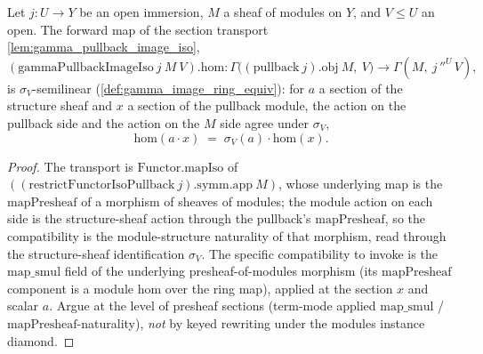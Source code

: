 \begin{lemma}
  \label{lem:gamma_pullback_image_iso_hom_semilinear}
  Let \(j : U \to Y\) be an open immersion, \(M\) a sheaf of modules on \(Y\), and \(V \le U\) an open. The
  forward map of the section transport \cref{lem:gamma_pullback_image_iso},
  \[
    (\mathrm{gammaPullbackImageIso}\ j\ M\ V).\mathrm{hom} :
      \Gamma\bigl((\mathrm{pullback}\ j).\mathrm{obj}\ M,\ V\bigr) \longrightarrow \Gamma(M,\ j\,''^{U}\,V),
  \]
  is \(\sigma_V\)-semilinear (\cref{def:gamma_image_ring_equiv}): for \(a\) a section of the structure sheaf
  and \(x\) a section of the pullback module, the action on the pullback side and the action on the \(M\)
  side agree under \(\sigma_V\),
  \[
    \mathrm{hom}(a \cdot x) \;=\; \sigma_V(a) \cdot \mathrm{hom}(x).
  \]
\end{lemma}
\begin{proof}
  The transport is \(\mathrm{Functor.mapIso}\) of \(((\mathrm{restrictFunctorIsoPullback}\ j).\mathrm{symm}.
  \mathrm{app}\ M)\), whose underlying map is the \(\mathrm{mapPresheaf}\) of a morphism of sheaves of
  modules; the module action on each side is the structure-sheaf action through the pullback's
  \(\mathrm{mapPresheaf}\), so the compatibility is the module-structure naturality of that morphism, read
  through the structure-sheaf identification \(\sigma_V\). The specific compatibility to invoke is the
  \(\mathrm{map\_smul}\) field of the underlying presheaf-of-modules morphism (its \(\mathrm{mapPresheaf}\)
  component is a module hom over the ring map), applied at the section \(x\) and scalar \(a\). Argue at the
  level of presheaf sections (term-mode applied \(\mathrm{map\_smul}\) / \(\mathrm{mapPresheaf}\)-naturality),
  \emph{not} by keyed rewriting under the modules instance diamond.
\end{proof}

